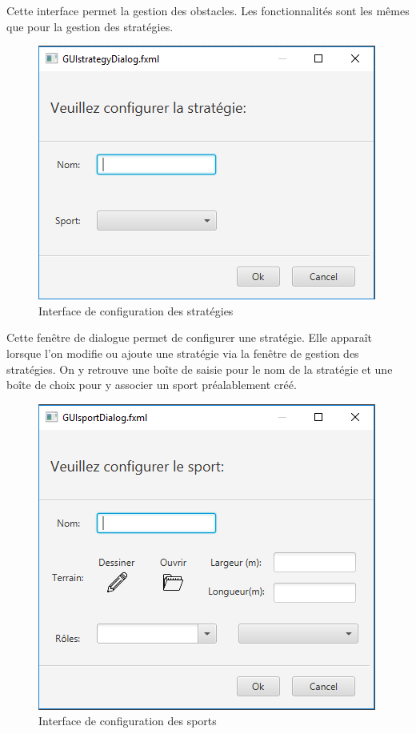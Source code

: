 Cette interface permet la gestion des obstacles.
Les fonctionnalités sont les mêmes que pour la gestion des stratégies.

\begin{figure}[htpb]
    \centering
    \includegraphics[scale=0.7]{fig/gui/gui_strategie_dialog.png}
    \caption{Interface de configuration des stratégies}
    \label{fig:gui:gui_strategie_dialog}
\end{figure}

Cette fenêtre de dialogue permet de configurer une stratégie.
Elle apparaît lorsque l'on modifie ou ajoute une stratégie via la fenêtre de gestion des stratégies.
On y retrouve une boîte de saisie pour le nom de la stratégie et une boîte de choix pour y associer un sport préalablement créé.

\begin{figure}[htpb]
    \centering
    \includegraphics[scale=0.7]{fig/gui/gui_sport_dialog.png}
    \caption{Interface de configuration des sports}
    \label{fig:gui:gui_sport_dialog}
\end{figure}

